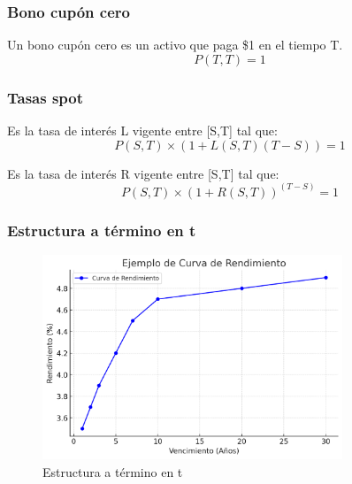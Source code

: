 
\begin{frame}
    \frametitle{Bono cupón cero}
    \begin{defin}
        Un bono cupón cero es un activo que paga \$1 en el tiempo T.\\
        \begin{equation*}
            P(T, T) = 1  
        \end{equation*}
    \end{defin}
\end{frame}


\begin{frame}
    \frametitle{Tasas spot}
    \begin{defin}
        Es la tasa de interés L vigente entre [S,T] tal que:
        \begin{equation*}
            P(S,T) \times (1+L(S,T) (T-S)) = 1
        \end{equation*}
    \end{defin}
    \begin{defin}
        Es la tasa de interés R vigente entre [S,T] tal que:
        \begin{equation*}
            P(S,T) \times (1+R(S,T))^{(T-S)} = 1
        \end{equation*}
    \end{defin}
\end{frame}

\begin{frame}
    \frametitle{Estructura a término en t}
    \begin{figure}[h]
       \centering
       \includegraphics[width=0.8\textwidth]{img/cap1/term_structure.png}
       \caption{Estructura a término en t}
       \label{term_structure}
    \end{figure}
\end{frame}

